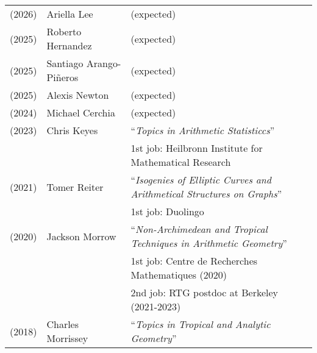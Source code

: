 \documentclass[margin,line]{res}
\newcommand{\defi}[1]{\textsf{#1}} 				%
\begin{document}
\begin{resume}
\begin{tabular}{lll}
  (2026) & \defi{Ariella Lee} & (expected)
    \vspace{4pt}\\    
  (2025) & \defi{Roberto Hernandez} & (expected)
    \vspace{4pt}\\    
  (2025) & \defi{Santiago Arango-Pi\~neros} & (expected)
    \vspace{4pt}\\  
  (2025) & \defi{Alexis Newton} & (expected)
    \vspace{4pt}\\
  (2024) & \defi{Michael Cerchia} & (expected)
    \vspace{4pt}\\
  (2023) & \defi{Chris Keyes} &  ``\emph{Topics in Arithmetic Statisticcs}'' \\
         && \hspace{4 pt} 1st job: Heilbronn Institute for Mathematical Research
         \vspace{4pt}\\
  (2021) & \defi{Tomer Reiter} &  ``\emph{Isogenies of Elliptic Curves and Arithmetical Structures on Graphs}'' \\
         && \hspace{4 pt} 1st job: Duolingo 
    \vspace{4pt}\\ 
  (2020) & \defi{Jackson Morrow} &  ``\emph{Non-Archimedean and Tropical Techniques in Arithmetic Geometry}'' \\
         && \hspace{4 pt} 1st job: Centre de Recherches Mathematiques (2020)\\
         &&  \hspace{4 pt} 2nd job: RTG postdoc at Berkeley (2021-2023)
    \vspace{4pt}\\
  (2018) & \defi{Charles Morrissey} &   ``\emph{Topics in Tropical and Analytic Geometry}'' \\

\end{tabular}
\end{resume}
\end{document}
